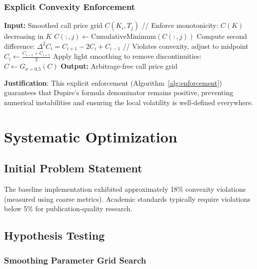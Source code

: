 \documentclass[12pt,a4paper]{article}
\begin{document}
\subsubsection{Explicit Convexity Enforcement}\label{sec:enforcement}

\begin{algorithm}
\caption{Convexity Enforcement}\label{alg:enforcement}
\begin{algorithmic}[1]
\STATE \textbf{Input:} Smoothed call price grid $C(K_i, T_j)$
    \STATE // Enforce monotonicity: $C(K)$ decreasing in $K$
    \STATE $C(:, j) \leftarrow \text{CumulativeMinimum}(C(:, j))$
            \STATE Compute second difference: $\Delta^2 C_i = C_{i+1} - 2C_i + C_{i-1}$
                \STATE // Violates convexity, adjust to midpoint
                \STATE $C_i \leftarrow \frac{C_{i-1} + C_{i+1}}{2}$
            \ENDIF
        \ENDFOR
    \ENDFOR
\ENDFOR
\STATE Apply light smoothing to remove discontinuities: $C \leftarrow G_{\sigma=0.5}(C)$
\STATE \textbf{Output:} Arbitrage-free call price grid
\end{algorithmic}
\end{algorithm}

\textbf{Justification}: This explicit enforcement (Algorithm~\ref{alg:enforcement}) guarantees that Dupire's formula denominator remains positive, preventing numerical instabilities and ensuring the local volatility is well-defined everywhere.

\section{Systematic Optimization}\label{sec:optimization}

\subsection{Initial Problem Statement}

The baseline implementation exhibited approximately 18\% convexity violations (measured using coarse metrics). Academic standards typically require violations below 5\% for publication-quality research.

\subsection{Hypothesis Testing}

\subsubsection{Smoothing Parameter Grid Search}
\end{document}
